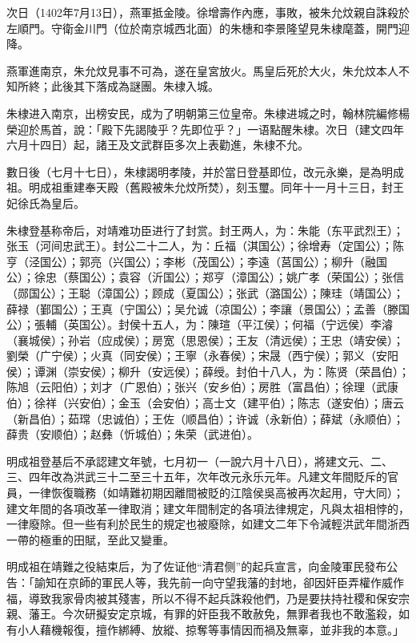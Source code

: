 次日（1402年7月13日），燕軍抵金陵。徐增壽作內應，事敗，被朱允炆親自誅殺於左順門。守衛金川門（位於南京城西北面）的朱橞和李景隆望見朱棣麾蓋，開門迎降。

燕軍進南京，朱允炆見事不可為，遂在皇宮放火。馬皇后死於大火，朱允炆本人不知所終；此後其下落成為謎團。朱棣入城。

朱棣进入南京，出榜安民，成为了明朝第三位皇帝。朱棣进城之时，翰林院編修楊榮迎於馬首，說：「殿下先謁陵乎？先即位乎？」一语點醒朱棣。次日（建文四年六月十四日）起，諸王及文武群臣多次上表勸進，朱棣不允。

數日後（七月十七日），朱棣謁明孝陵，并於當日登基即位，改元永樂，是為明成祖。明成祖重建奉天殿（舊殿被朱允炆所焚），刻玉璽。同年十一月十三日，封王妃徐氏為皇后。

朱棣登基称帝后，对靖难功臣进行了封赏。封王两人，为：朱能（东平武烈王）；张玉（河间忠武王）。封公二十二人，为：丘福（淇国公）；徐增寿（定国公）；陈亨（泾国公）；郭亮（兴国公）；李彬（茂国公）；李遠（莒国公）；柳升（融国公）；徐忠（蔡国公）；袁容（沂国公）；郑亨（漳国公）；姚广孝（荣国公）；张信（郧国公）；王聪（漳国公）；顾成（夏国公）；张武（潞国公）；陳珪（靖国公）；薛禄（鄞国公）；王真（宁国公）；吴允诚（凉国公）；李讓（景国公）；孟善（滕国公）；張輔（英国公）。封侯十五人，为：陳瑄（平江侯）；何福（宁远侯）李濬（襄城侯）；孙岩（应成侯）；房宽（思恩侯）；王友（清远侯）；王忠（靖安侯）；劉榮（广宁侯）；火真（同安侯）；王寧（永春侯）；宋晟（西宁侯）；郭义（安阳侯）；谭渊（崇安侯）；柳升（安远侯）；薛绶。封伯十八人，为：陈贤（荣昌伯）；陈旭（云阳伯）；刘才（广恩伯）；张兴（安乡伯）；房胜（富昌伯）；徐理（武康伯）；徐祥（兴安伯）；金玉（会安伯）；高士文（建平伯）；陈志（遂安伯）；唐云（新昌伯）；茹瑺（忠诚伯）；王佐（顺昌伯）；许诚（永新伯）；薛斌（永顺伯）；薛贵（安顺伯）；赵彝（忻城伯）；朱荣（武进伯）。

明成祖登基后不承認建文年號，七月初一（一說六月十八日），將建文元、二、三、四年改為洪武三十二至三十五年，次年改元永乐元年。凡建文年間貶斥的官員，一律恢復職務（如靖難初期因離間被貶的江陰侯吳高被再次起用，守大同）；建文年間的各項改革一律取消；建文年間制定的各項法律規定，凡與太祖相悖的，一律廢除。但一些有利於民生的規定也被廢除，如建文二年下令減輕洪武年間浙西一帶的極重的田賦，至此又變重。

明成祖在靖難之役結束后，为了佐证他“清君侧”的起兵宣言，向金陵軍民發布公告：「諭知在京師的軍民人等，我先前一向守望我藩的封地，卻因奸臣弄權作威作福，導致我家骨肉被其殘害，所以不得不起兵誅殺他們，乃是要扶持社稷和保安宗親、藩王。今次研擬安定京城，有罪的奸臣我不敢赦免，無罪者我也不敢濫殺，如有小人藉機報復，擅作綁縛、放縱、掠奪等事情因而禍及無辜，並非我的本意。」

